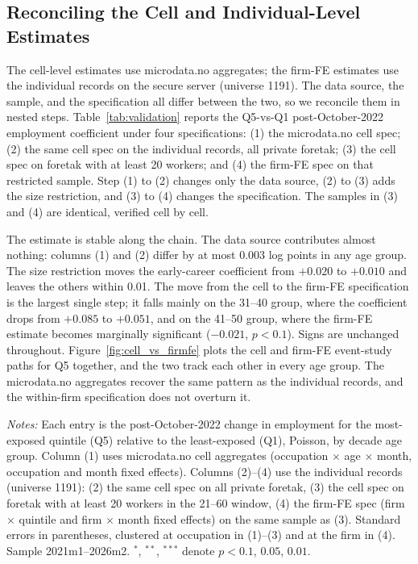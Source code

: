 \documentclass[12pt]{article}
\begin{document}
\subsection{Reconciling the Cell and Individual-Level Estimates}\label{sec:results:reconcile}

The cell-level estimates use microdata.no aggregates; the firm-FE estimates use the individual records on the secure server (universe 1191). The data source, the sample, and the specification all differ between the two, so we reconcile them in nested steps. Table~\ref{tab:validation} reports the Q5-vs-Q1 post-October-2022 employment coefficient under four specifications: (1) the microdata.no cell spec; (2) the same cell spec on the individual records, all private foretak; (3) the cell spec on foretak with at least 20 workers; and (4) the firm-FE spec on that restricted sample. Step (1) to (2) changes only the data source, (2) to (3) adds the size restriction, and (3) to (4) changes the specification. The samples in (3) and (4) are identical, verified cell by cell.

The estimate is stable along the chain. The data source contributes almost nothing: columns (1) and (2) differ by at most 0.003 log points in any age group. The size restriction moves the early-career coefficient from $+0.020$ to $+0.010$ and leaves the others within 0.01. The move from the cell to the firm-FE specification is the largest single step; it falls mainly on the 31--40 group, where the coefficient drops from $+0.085$ to $+0.051$, and on the 41--50 group, where the firm-FE estimate becomes marginally significant ($-0.021$, $p<0.1$). Signs are unchanged throughout. Figure~\ref{fig:cell_vs_firmfe} plots the cell and firm-FE event-study paths for Q5 together, and the two track each other in every age group. The microdata.no aggregates recover the same pattern as the individual records, and the within-firm specification does not overturn it.

\begin{table}[tp]
  \centering
  \caption{Cell-vs-individual reconciliation: Q5-vs-Q1 employment effect across nested specifications, private sector.}
  \label{tab:validation}
  
  \begin{minipage}{\textwidth}\footnotesize\textit{Notes:} Each entry is the post-October-2022 change in employment for the most-exposed quintile (Q5) relative to the least-exposed (Q1), Poisson, by decade age group. Column (1) uses microdata.no cell aggregates (occupation $\times$ age $\times$ month, occupation and month fixed effects). Columns (2)--(4) use the individual records (universe 1191): (2) the same cell spec on all private foretak, (3) the cell spec on foretak with at least 20 workers in the 21--60 window, (4) the firm-FE spec (firm $\times$ quintile and firm $\times$ month fixed effects) on the same sample as (3). Standard errors in parentheses, clustered at occupation in (1)--(3) and at the firm in (4). Sample 2021m1--2026m2. $^{*}$, $^{**}$, $^{***}$ denote $p<0.1$, $0.05$, $0.01$.\end{minipage}
\end{table}
\end{document}
